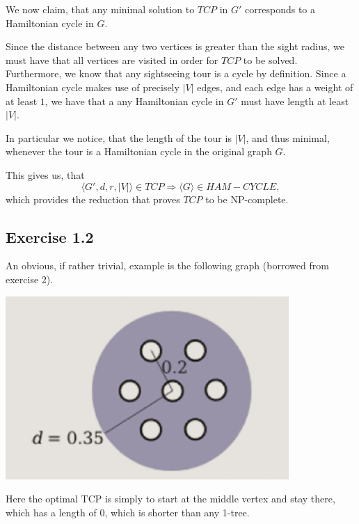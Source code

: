 \documentclass[11pt,a4paper]{article}
\begin{document}
We now claim, that any minimal solution to $TCP$ in $G'$ corresponds to
a Hamiltonian cycle in $G$.

Since the distance between any two vertices is greater than the sight radius,
we must have that all vertices are visited in order for $TCP$ to be solved.
Furthermore, we know that any sightseeing tour is a cycle by definition. Since a
Hamiltonian cycle makes use of precisely $|V|$ edges, and each edge has a weight of
at least $1$, we have that a any Hamiltonian cycle in $G'$ must have length at least $|V|$.

In particular we notice, that the length of the tour is $|V|$, and thus minimal,
whenever the tour is a Hamiltonian cycle in the original graph $G$.

This gives us, that
\[
    \langle G', d, r, |V| \rangle \in TCP \Rightarrow \langle G \rangle \in HAM-CYCLE,
\]
which provides the reduction that proves $TCP$ to be NP-complete.

\subsection{Exercise 1.2}
An obvious, if rather trivial, example is the following graph (borrowed from exercise 2).

\includegraphics[width=\textwidth]{tcp.png}

Here the optimal TCP is simply to start at the middle vertex and stay there, which has a length of 0, which is shorter than any 1-tree.
\end{document}
